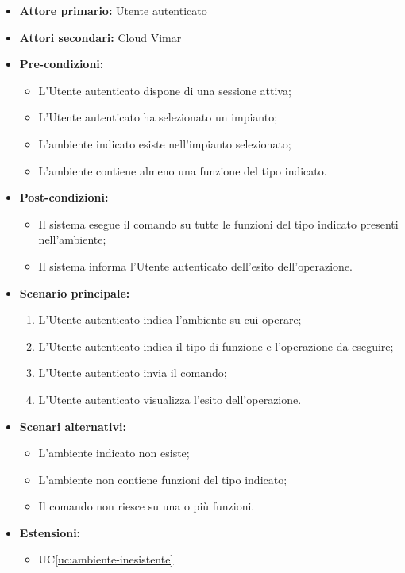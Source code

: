 \documentclass[11pt, a4paper]{article}
\newcounter{uc}                            %
\newcommand{\ucref}[1]{UC\ref{uc:#1}}
\begin{document}
\begin{itemize}[label=\textbullet]
  \item \textbf{Attore primario:} Utente autenticato
  \item \textbf{Attori secondari:} Cloud Vimar
  \item \textbf{Pre-condizioni:}
  \begin{itemize}[label=‣]
    \item L'Utente autenticato dispone di una sessione attiva;
    \item L'Utente autenticato ha selezionato un impianto;
    \item L'ambiente indicato esiste nell'impianto selezionato;
    \item L'ambiente contiene almeno una funzione del tipo indicato.
  \end{itemize}
  \item \textbf{Post-condizioni:}
  \begin{itemize}[label=‣]
    \item Il sistema esegue il comando su tutte le funzioni del tipo indicato presenti nell'ambiente;
    \item Il sistema informa l'Utente autenticato dell'esito dell'operazione.
  \end{itemize}
  \item \textbf{Scenario principale:}
  \begin{enumerate}
    \item L'Utente autenticato indica l'ambiente su cui operare;
    \item L'Utente autenticato indica il tipo di funzione e l'operazione da eseguire;
    \item L'Utente autenticato invia il comando;
    \item L'Utente autenticato visualizza l'esito dell'operazione.
  \end{enumerate}
  \item \textbf{Scenari alternativi:}
  \begin{itemize}[label=‣]
    \item L'ambiente indicato non esiste;
    \item L'ambiente non contiene funzioni del tipo indicato;
    \item Il comando non riesce su una o più funzioni.
  \end{itemize}
  \item \textbf{Estensioni:}
  \begin{itemize}[label=‣]
    \item \ucref{ambiente-inesistente}
  \end{itemize}
\end{itemize}
\end{document}
